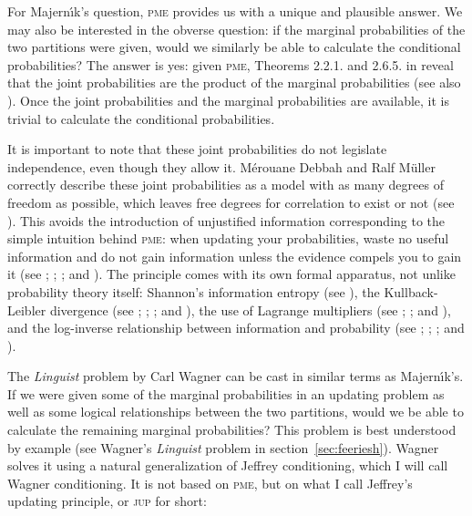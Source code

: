 \documentclass[phd,12pt,oneside]{ubcthesis}
\begin{document}
For Majern{\'\i}k's question, \textsc{pme} provides us with a unique
and plausible answer. We may also be interested in the obverse
question: if the marginal probabilities of the two partitions were
given, would we similarly be able to calculate the conditional
probabilities? The answer is yes: given \textsc{pme}, Theorems 2.2.1.
and 2.6.5. in  reveal that the joint
probabilities are the product of the marginal probabilities (see also
). Once the joint probabilities and the
marginal probabilities are available, it is trivial to calculate the
conditional probabilities.

It is important to note that these joint probabilities do not
legislate independence, even though they allow it. M{\'e}rouane Debbah
and Ralf M{\"u}ller correctly describe these joint probabilities as a
model with as many degrees of freedom as possible, which leaves free
degrees for correlation to exist or not (see
). This avoids the introduction of
unjustified information corresponding to the simple intuition behind
\textsc{pme}: when updating your probabilities, waste no useful
information and do not gain information unless the evidence compels
you to gain it (see ;
; ; and
). The principle comes with its own
formal apparatus, not unlike probability theory itself: Shannon's
information entropy (see ), the Kullback-Leibler
divergence (see ;
; ; and
), the use of Lagrange multipliers (see
; ; and
), and the log-inverse relationship
between information and probability (see ;
; ; and
). 

The \emph{Linguist} problem by Carl Wagner can be cast in similar
terms as Majern{\'\i}k's. If we were given some of the marginal
probabilities in an updating problem as well as some logical
relationships between the two partitions, would we be able to
calculate the remaining marginal probabilities? This problem is best
understood by example (see Wagner's \emph{Linguist} problem in
section~\ref{sec:feeriesh}). Wagner solves it using a natural
generalization of Jeffrey conditioning, which I will call Wagner
conditioning. It is not based on \textsc{pme}, but on what I call
Jeffrey's updating principle, or \textsc{jup} for short:
\end{document}
